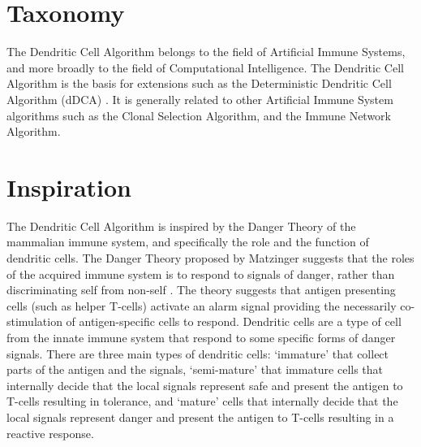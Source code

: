 \documentclass[a4paper, 11pt]{article}
\begin{document}
\section{Taxonomy}
\label{sec:taxonomy}
The Dendritic Cell Algorithm belongs to the field of Artificial Immune Systems, and more broadly to the field of Computational Intelligence.
The Dendritic Cell Algorithm is the basis for extensions such as the Deterministic Dendritic Cell Algorithm (dDCA) \cite{Greensmith2008}.
It is generally related to other Artificial Immune System algorithms such as the Clonal Selection Algorithm, and the Immune Network Algorithm.

\section{Inspiration}
\label{sec:inspiration}
The Dendritic Cell Algorithm is inspired by the Danger Theory of the mammalian immune system, and specifically the role and the function of dendritic cells. 
The Danger Theory proposed by Matzinger suggests that the roles of the acquired immune system is to respond to signals of danger, rather than discriminating self from non-self \cite{Matzinger1994, Matzinger2002}. The theory suggests that antigen presenting cells (such as helper T-cells) activate an alarm signal providing the necessarily co-stimulation of antigen-specific cells to respond. Dendritic cells are a type of cell from the innate immune system that respond to some specific forms of danger signals. There are three main types of dendritic cells: `immature' that collect parts of the antigen and the signals, `semi-mature' that immature cells that internally decide that the local signals represent safe and present the antigen to T-cells resulting in tolerance, and `mature' cells that internally decide that the local signals represent danger and present the antigen to T-cells resulting in a reactive response.
\end{document}
